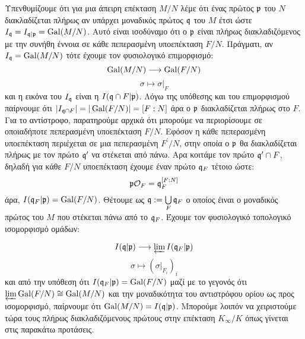 \noindent Υπενθυμίζουμε ότι για μια άπειρη  επέκταση $M/N$ λέμε ότι ένας πρώτος $\mathfrak{p}$ του $N$ διακλαδίζεται πλήρως αν υπάρχει μοναδικός πρώτος $\mathfrak{q}$ του $M$ έτσι ώστε $I_{\mathfrak{q}} = I_{\mathfrak{q} | \mathfrak{p}} = \operatorname{Gal}(M/N)$. Αυτό είναι ισοδύναμο ότι ο $\mathfrak{p}$ είναι πλήρως διακλαδιζόμενος με την συνήθη έννοια σε κάθε πεπερασμένη  υποεπέκταση $F/N$. Πράγματι, αν $I_{\mathfrak{q}} = \operatorname{Gal}(M/N)$ τότε έχουμε τον φυσιολογικό επιμορφισμό:
$$\operatorname{Gal}(M/N) \longrightarrow \operatorname{Gal}(F/N)$$
$$\sigma \longmapsto \sigma|_F$$ και η εικόνα του $I_{\mathfrak{q}}$ είναι η $I(\mathfrak{q} \cap F | \mathfrak{p})$. Λόγω της υπόθεσης και του επιμορφισμού παίρνουμε ότι $|I_{\mathfrak{q}\cap F}| = |\operatorname{Gal}(F/N)| = [F:N]$ άρα ο $\mathfrak{p}$ διακλαδίζεται πλήρως στο $F$. Για το αντίστροφο, παρατηρούμε αρχικά ότι μπορούμε να περιορίσουμε σε οποιαδήποτε πεπερασμένη υποεπέκταση $F/N$. Εφόσον η κάθε πεπερασμένη υποεπέκταση περιέχεται σε μια πεπερασμένη  $F^\prime/N$, στην οποία ο $\mathfrak{p}$ θα διακλαδίζεται πλήρως με  τον πρώτο $\mathfrak{q}^\prime$ να στέκεται από πάνω. Αρα κοιτάμε τον πρώτο  $\mathfrak{q}^\prime \cap F $, δηλαδή για κάθε $F/N$ υποεπέκταση
έχουμε έναν πρώτο $\mathfrak{q}_F$ τέτοιο ώστε:
$$\mathfrak{p} \mathcal{O}_F = \mathfrak{q}_F^{[F:N]}$$
άρα, $I(\mathfrak{q}_F | \mathfrak{p}) = \operatorname{Gal}(F/N)$. Θέτουμε ως $\mathfrak{q} := \bigcup\limits_F \mathfrak{q}_F$ ο οποίος έιναι ο μοναδικός πρώτος του $M$ που στέκεται πάνω από το $\mathfrak{q}_F$. Έχουμε τον φυσιολογικό τοπολογικό ισομορφισμό ομάδων:

$$I(\mathfrak{q} | \mathfrak{p}) \longrightarrow \varprojlim I(\mathfrak{q}_F | \mathfrak{p})$$
$$\sigma \longmapsto (\sigma|_{F_i})_i $$
και από την υπόθεση ότι $I(\mathfrak{q}_F | \mathfrak{p}) = \operatorname{Gal}(F/N)$ μαζί με το γεγονός ότι $\varprojlim \operatorname{Gal}(F/N) \cong \operatorname{Gal}(M/N)$ και την μοναδικότητα του αντιστρόφου ορίου ως προς ισομορφισμό, παίρνουμε ότι $\operatorname{Gal}(M/N) = I(\mathfrak{q} | \mathfrak{p})$. Μπορούμε λοιπόν να χειριστούμε τώρα τους πλήρως διακλαδιζόμενους πρώτους στην επέκταση $K_\infty/K$ όπως γίνεται στις παρακάτω προτάσεις.

